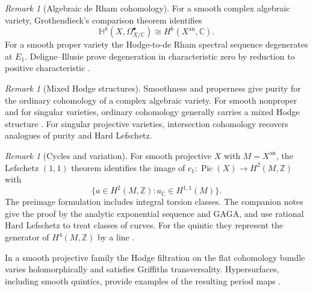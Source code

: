 \documentclass[11pt,reqno]{amsart}
\theoremstyle{definition}
\theoremstyle{remark}
\newtheorem{remark}[theorem]{Remark}
\newcommand{\C}{\mathbb{C}}
\newcommand{\Z}{\mathbb{Z}}
\newcommand{\Xan}{X^{\mathrm{an}}}
\DeclareMathOperator{\Pic}{Pic}
\begin{document}
\begin{remark}[Algebraic de Rham cohomology]
For a smooth complex algebraic variety, Grothendieck's comparison
theorem \cite{grothendieck1966derham} identifies
\[
\mathbb H^k(X,\Omega^\bullet_{X/\C})\cong H^k(\Xan,\C).
\]
For a smooth proper variety the Hodge-to-de Rham spectral sequence
degenerates at $E_1$. Deligne--Illusie prove degeneration in
characteristic zero by reduction to positive characteristic
\cite[Cor.~2.7]{deligneillusie1987}.
\end{remark}

\begin{remark}[Mixed Hodge structures]
Smoothness and properness give purity for the ordinary cohomology of a
complex algebraic variety. For smooth nonproper and for singular varieties,
ordinary cohomology generally carries a mixed Hodge structure
\cite{deligne1971hodge,deligne1974hodge}. For singular projective varieties,
intersection cohomology recovers analogues of purity and Hard Lefschetz.
\end{remark}

\begin{remark}[Cycles and variation]
For smooth projective $X$ with $M=\Xan$, the Lefschetz $(1,1)$ theorem
identifies the image of $c_1:\Pic(X)\to H^2(M,\Z)$ with
\[
\{a\in H^2(M,\Z): a_{\C}\in H^{1,1}(M)\}.
\]
The preimage formulation includes integral torsion classes. The companion
notes give the proof by the analytic exponential sequence and GAGA, and
use rational Hard Lefschetz to treat classes of curves. For the quintic
they represent the generator of $H^4(M,\Z)$ by a line
\cite[\S\S10.1--10.2]{hodgenotes}.

In a smooth projective family the Hodge filtration on the flat cohomology
bundle varies holomorphically and satisfies Griffiths transversality.
Hypersurfaces, including smooth quintics, provide examples of the
resulting period maps \cite[Ch.~6]{voisin2003hodge2}.
\end{remark}



\end{document}
